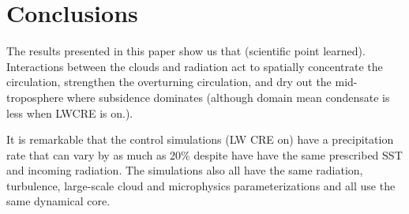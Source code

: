 \documentclass[draft]{agujournal2019}
\begin{document}
%


\section{Conclusions}

The results presented in this paper show us that (scientific point learned).    Interactions between the clouds and radiation
act to spatially concentrate the circulation, strengthen the overturning circulation, and dry out the mid-troposphere where 
subsidence dominates (although domain mean condensate is less when LWCRE is on.).  

It is remarkable that the control simulations (LW CRE on) have a precipitation rate  that can vary by as much as 
20\% despite have have the same prescribed SST and incoming radiation.  The simulations also all have the same radiation,
turbulence, large-scale cloud and microphysics parameterizations and all use the same dynamical core.    
\end{document}
